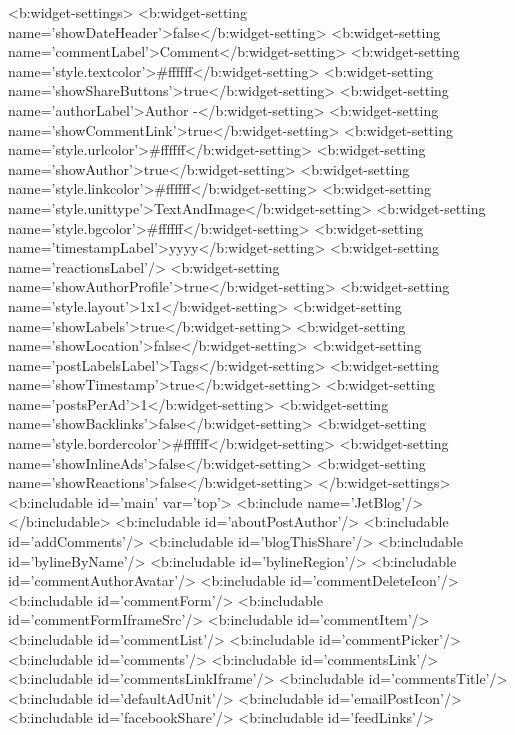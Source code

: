 {{{{    <b:widget-settings>
      <b:widget-setting name='showDateHeader'>false</b:widget-setting>
      <b:widget-setting name='commentLabel'>Comment</b:widget-setting>
      <b:widget-setting name='style.textcolor'>#ffffff</b:widget-setting>
      <b:widget-setting name='showShareButtons'>true</b:widget-setting>
      <b:widget-setting name='authorLabel'>Author -</b:widget-setting>
      <b:widget-setting name='showCommentLink'>true</b:widget-setting>
      <b:widget-setting name='style.urlcolor'>#ffffff</b:widget-setting>
      <b:widget-setting name='showAuthor'>true</b:widget-setting>
      <b:widget-setting name='style.linkcolor'>#ffffff</b:widget-setting>
      <b:widget-setting name='style.unittype'>TextAndImage</b:widget-setting>
      <b:widget-setting name='style.bgcolor'>#ffffff</b:widget-setting>
      <b:widget-setting name='timestampLabel'>yyyy</b:widget-setting>
      <b:widget-setting name='reactionsLabel'/>
      <b:widget-setting name='showAuthorProfile'>true</b:widget-setting>
      <b:widget-setting name='style.layout'>1x1</b:widget-setting>
      <b:widget-setting name='showLabels'>true</b:widget-setting>
      <b:widget-setting name='showLocation'>false</b:widget-setting>
      <b:widget-setting name='postLabelsLabel'>Tags</b:widget-setting>
      <b:widget-setting name='showTimestamp'>true</b:widget-setting>
      <b:widget-setting name='postsPerAd'>1</b:widget-setting>
      <b:widget-setting name='showBacklinks'>false</b:widget-setting>
      <b:widget-setting name='style.bordercolor'>#ffffff</b:widget-setting>
      <b:widget-setting name='showInlineAds'>false</b:widget-setting>
      <b:widget-setting name='showReactions'>false</b:widget-setting>
    </b:widget-settings>
    <b:includable id='main' var='top'>
      <b:include name='JetBlog'/>
    </b:includable>
    <b:includable id='aboutPostAuthor'/>
    <b:includable id='addComments'/>
    <b:includable id='blogThisShare'/>
    <b:includable id='bylineByName'/>
    <b:includable id='bylineRegion'/>
    <b:includable id='commentAuthorAvatar'/>
    <b:includable id='commentDeleteIcon'/>
    <b:includable id='commentForm'/>
    <b:includable id='commentFormIframeSrc'/>
    <b:includable id='commentItem'/>
    <b:includable id='commentList'/>
    <b:includable id='commentPicker'/>
    <b:includable id='comments'/>
    <b:includable id='commentsLink'/>
    <b:includable id='commentsLinkIframe'/>
    <b:includable id='commentsTitle'/>
    <b:includable id='defaultAdUnit'/>
    <b:includable id='emailPostIcon'/>
    <b:includable id='facebookShare'/>
    <b:includable id='feedLinks'/>
}}}}
